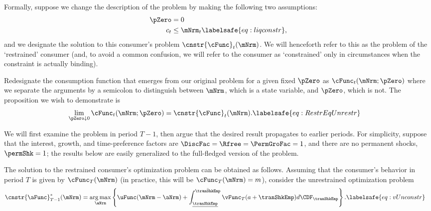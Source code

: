 \documentclass[\econtexRoot/BufferStockTheory]{subfiles}
\begin{document}
Formally, suppose we change the description of the problem by making
the following two assumptions:
\begin{eqnarray*}
  \pZero   & = 0
  \\  c_{t} & \leq  \mNrm_{t} \labelsafe{eq:liqconstr},
\end{eqnarray*}
and we designate the solution to this consumer's problem $\cnstr{\cFunc}_{t}(\mNrm)$.
We will henceforth refer to this as the problem of the `restrained' consumer (and, to avoid a common confusion, we will refer to the consumer as `constrained' only in circumstances when the constraint is actually binding).

Redesignate the consumption function that emerges from our original problem for a given fixed $\pZero$ as $\cFunc_{t}(\mNrm;\pZero)$ where we separate the arguments by a semicolon to distinguish between $\mNrm$, which is a state variable, and $\pZero$, which is not.
The proposition we wish to demonstrate is
\begin{equation}\begin{gathered}\begin{aligned}
      \lim_{\pZero \downarrow 0} \cFunc_{t}(\mNrm;\pZero)  & = \cnstr{\cFunc}_{t}(\mNrm). \labelsafe{eq:RestrEqUnrestr} 
    \end{aligned}\end{gathered}\end{equation}

We will first examine the problem in period $T-1$, then argue that the desired result propagates to earlier periods.
For simplicity, suppose that the interest, growth, and time-preference factors are $\DiscFac = \Rfree = \PermGroFac = 1$, and there are no permanent shocks, $\permShk=1$; the results below are easily generalized to the full-fledged version of the problem.

The solution to the restrained consumer's optimization problem can be obtained as follows.
Assuming that the consumer's behavior in period $T$ is given by $\cFunc_{T}(\mNrm)$ (in practice, this will be $\cFunc_{T}(\mNrm)=m$), consider the unrestrained optimization problem
\begin{equation}\begin{gathered}\begin{aligned}
      \cnstr{\aFunc}^{*}_{T-1}(\mNrm)  & = \underset{\aNrm}{\arg \max} \left\{\uFunc(\mNrm-\aNrm) +  \int_{\underline{\tranShkEmp}}^{\bar{\tranShkEmp}} \vFunc_{T}(a+\tranShkEmp) d\CDF_{\tranShkEmp} \right\}. \labelsafe{eq:vUnconstr}
    \end{aligned}\end{gathered}\end{equation}
\end{document}
